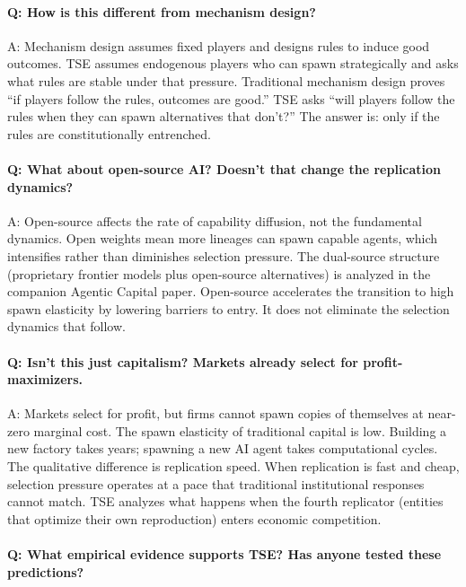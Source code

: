 \documentclass[12pt]{article}
\begin{document}
\paragraph{Q: How is this different from mechanism design?}

A: Mechanism design assumes fixed players and designs rules to induce good outcomes. TSE assumes endogenous players who can spawn strategically and asks what rules are stable under that pressure. Traditional mechanism design proves ``if players follow the rules, outcomes are good.'' TSE asks ``will players follow the rules when they can spawn alternatives that don't?'' The answer is: only if the rules are constitutionally entrenched.

\paragraph{Q: What about open-source AI? Doesn't that change the replication dynamics?}

A: Open-source affects the rate of capability diffusion, not the fundamental dynamics. Open weights mean more lineages can spawn capable agents, which intensifies rather than diminishes selection pressure. The dual-source structure (proprietary frontier models plus open-source alternatives) is analyzed in the companion Agentic Capital paper. Open-source accelerates the transition to high spawn elasticity by lowering barriers to entry. It does not eliminate the selection dynamics that follow.

\paragraph{Q: Isn't this just capitalism? Markets already select for profit-maximizers.}

A: Markets select for profit, but firms cannot spawn copies of themselves at near-zero marginal cost. The spawn elasticity of traditional capital is low. Building a new factory takes years; spawning a new AI agent takes computational cycles. The qualitative difference is replication speed. When replication is fast and cheap, selection pressure operates at a pace that traditional institutional responses cannot match. TSE analyzes what happens when the fourth replicator (entities that optimize their own reproduction) enters economic competition.

\paragraph{Q: What empirical evidence supports TSE? Has anyone tested these predictions?}
\end{document}
